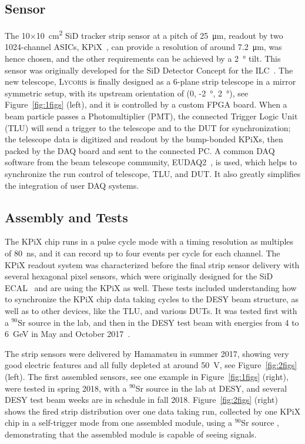 \documentclass[conference]{IEEEtran}
\def\lycoris{\textsc{Lycoris }}%
\begin{document}
\subsection{Sensor}

The 10$\times$\SI{10}{\square\centi\metre} SiD tracker strip sensor at a pitch of \SI{25}{\micro\metre}, readout by two 1024-channel ASICs, KPiX~\cite{kpix}, can provide a resolution of around \SI{7.2}{\micro\metre},
was hence chosen, and the other requirements can be achieved by a \SI{2}{\degree} tilt. This sensor was originally developed for the SiD Detector Concept for the ILC~\cite{Behnke:2013lya}.
The new telescope, \lycoris is finally designed as a 6-plane strip telescope in a mirror symmetric setup, with its upstream orientation of (0, -\SI{2}{\degree}, \SI{2}{\degree}),
see Figure~\ref{fig:1figs} (left), and it is controlled by a custom FPGA board.
When a beam particle passes a Photomultiplier (PMT), the connected Trigger Logic Unit (TLU) will send a trigger to the telescope and to the DUT for synchronization;
the telescope data is digitized and readout by the bump-bonded KPiXs, then packed by the DAQ board and sent to the connected PC. A common DAQ software from the beam telescope
community, EUDAQ2~\cite{eudaq2}, is used, which helps to synchronize the run control of telescope, TLU, and DUT. It also greatly simplifies the integration of user DAQ systems.

\subsection{Assembly and Tests}

The KPiX chip runs in a pulse cycle mode with a timing resolution as multiples of \SI{80}{\nano\second}, and it can record up to four events per cycle for each channel.
The KPiX readout system was characterized before the final strip sensor delivery with several hexagonal pixel sensors, which were originally designed for the SiD ECAL~\cite{Behnke:2013lya}
and are using the KPiX as well. These tests included understanding how to synchronize the KPiX chip data taking cycles to the DESY beam structure, as well as to other devices, like the TLU, and various DUTs.
It was tested first with a $^{90}$Sr source in the lab, and then in the DESY test beam with energies from 4 to \SI{6}{\GeV} in May and October 2017~\cite{lycoris1}.

The strip sensors were delivered by Hamamatsu in summer 2017, showing very good electric features and all fully depleted at around \SI{50}{\volt}, see Figure~\ref{fig:2figs} (left).
The first assembled sensors, see one example in Figure~\ref{fig:1figs} (right), were tested in spring 2018, with a $^{90}$Sr source in the lab at DESY, and several DESY test beam weeks are in schedule in fall 2018.
Figure~\ref{fig:2figs} (right) shows the fired strip distribution over one data taking run, collected by one KPiX chip in a self-trigger mode from one assembled module, using a $^{90}$Sr source ,
demonstrating that the assembled module is capable of seeing signals.
\end{document}
